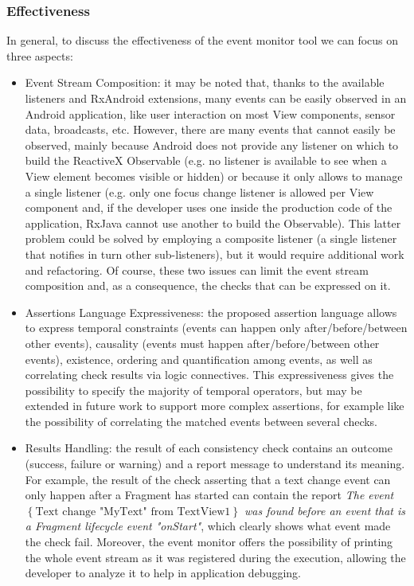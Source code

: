 \documentclass[11pt,a4paper,notitlepage]{article}
\begin{document}
\subsubsection{Effectiveness}
In general, to discuss the effectiveness of the event monitor tool we can focus on three aspects:
\begin{itemize}
	\item Event Stream Composition: it may be noted that, thanks to the available listeners and RxAndroid extensions, many events can be easily observed in an Android application, like user interaction on most View components, sensor data, broadcasts, etc. However, there are many events that cannot easily be observed, mainly because Android does not provide any listener on which to build the ReactiveX Observable (e.g. no listener is available to see when a View element becomes visible or hidden) or because it only allows to manage a single listener (e.g. only one focus change listener is allowed per View component and, if the developer uses one inside the production code of the application, RxJava cannot use another to build the Observable). This latter problem could be solved by employing a composite listener (a single listener that notifies in turn other sub-listeners), but it would require additional work and refactoring. Of course, these two issues can limit the event stream composition and, as a consequence, the checks that can be expressed on it.
	\item Assertions Language Expressiveness: the proposed assertion language allows to express temporal constraints (events can happen only after/before/between other events), causality (events must happen after/before/between other events), existence, ordering and quantification among events, as well as correlating check results via logic connectives. This expressiveness gives the possibility to specify the majority of temporal operators, but may be extended in future work to support more complex assertions, for example like the possibility of correlating the matched events between several checks.
	\item Results Handling: the result of each consistency check contains an outcome (success, failure or warning) and a report message to understand its meaning. For example, the result of the check asserting that a text change event can only happen after a Fragment has started can contain the report \textit{The event $\left\{\mbox{Text change "MyText" from TextView1}\right\}$ was found before an event that is a Fragment lifecycle event "onStart"}, which clearly shows what event made the check fail. Moreover, the event monitor offers the possibility of printing the whole event stream as it was registered during the execution, allowing the developer to analyze it to help in application debugging.
\end{itemize}
\end{document}
